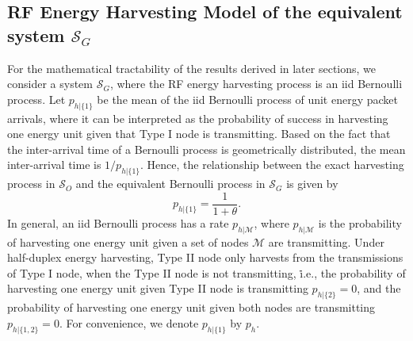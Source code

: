 \documentclass[draftcls,12pt,onecolumn]{IEEEtran}
\begin{document}
\subsection{RF Energy Harvesting Model of the equivalent system $\mathcal{S}_G$}

For the mathematical tractability of the results derived in later sections, we consider a system $\mathcal{S}_G$, where the RF energy harvesting process is an iid Bernoulli process. Let $p_{h|\lbrace 1 \rbrace}$ be the mean of the iid Bernoulli process of unit energy packet arrivals, where it can be interpreted as the probability of success in harvesting one energy unit given that Type I node is transmitting. Based on the fact that the inter-arrival time of a Bernoulli process is geometrically distributed, the mean inter-arrival time is $1/p_{h|\lbrace 1 \rbrace}$. Hence, the relationship between the exact harvesting process in $\mathcal{S}_O$ and the equivalent Bernoulli process in $\mathcal{S}_G$ is given by
\begin{equation}\label{eqn: theta}
p_{h|\lbrace 1 \rbrace} = \frac{1}{1+\theta}.
\end{equation}
\indent In general, an iid Bernoulli process has a rate $p_{h|\mathcal{M}}$, where $p_{h|\mathcal{M}}$ is the probability of harvesting one energy unit given a set of nodes $\mathcal{M}$ are transmitting. Under half-duplex energy harvesting, Type II node only harvests from the transmissions of Type I node, when the Type II node is not transmitting, \.i.e., the probability of harvesting one energy unit given Type II node is transmitting $p_{h|\lbrace 2 \rbrace}=0$, and the probability of harvesting one energy unit given both nodes are transmitting $p_{h|\lbrace 1,2 \rbrace}=0$. For convenience, we denote $p_{h|\lbrace 1 \rbrace}$ by $p_{h}$. 
\end{document}
